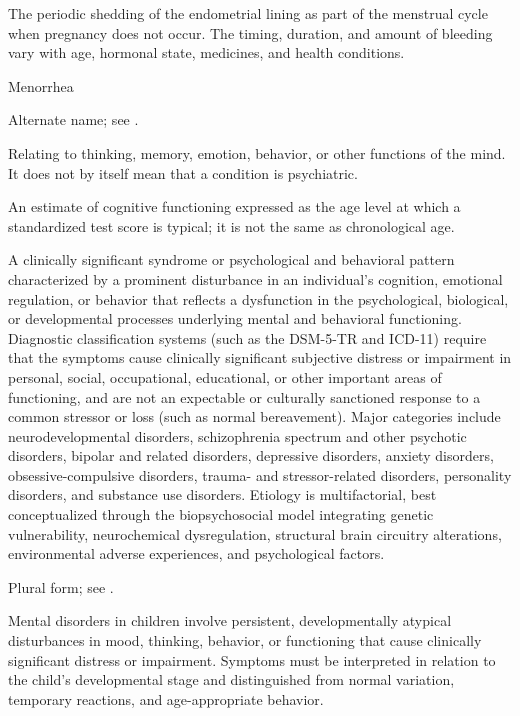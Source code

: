  The periodic shedding of the endometrial lining as part of the menstrual cycle when pregnancy does not occur.
The timing, duration, and amount of bleeding vary with age, hormonal state, medicines,
and health conditions.

\synonyms
Menorrhea

 Alternate name; see .

 Relating to thinking, memory, emotion, behavior, or other functions of the mind. It does not by itself mean that a condition is psychiatric.

 An estimate of cognitive functioning expressed as the age level at which a standardized test score is typical; it is not the same as chronological age.

 A clinically significant syndrome or psychological and behavioral pattern characterized by a prominent disturbance in an individual's cognition, emotional regulation, or behavior that reflects a dysfunction in the psychological, biological, or developmental processes underlying mental and behavioral functioning. Diagnostic classification systems (such as the DSM-5-TR and ICD-11) require that the symptoms cause clinically significant subjective distress or impairment in personal, social, occupational, educational, or other important areas of functioning, and are not an expectable or culturally sanctioned response to a common stressor or loss (such as normal bereavement). Major categories include neurodevelopmental disorders, schizophrenia spectrum and other psychotic disorders, bipolar and related disorders, depressive disorders, anxiety disorders, obsessive-compulsive disorders, trauma- and stressor-related disorders, personality disorders, and substance use disorders. Etiology is multifactorial, best conceptualized through the biopsychosocial model integrating genetic vulnerability, neurochemical dysregulation, structural brain circuitry alterations, environmental adverse experiences, and psychological factors.

 Plural form; see .

 Mental disorders in children involve persistent, developmentally atypical disturbances in mood, thinking, behavior, or functioning that cause clinically significant distress or impairment. Symptoms must be interpreted in relation to the child’s developmental stage and distinguished from normal variation, temporary reactions, and age-appropriate behavior.

